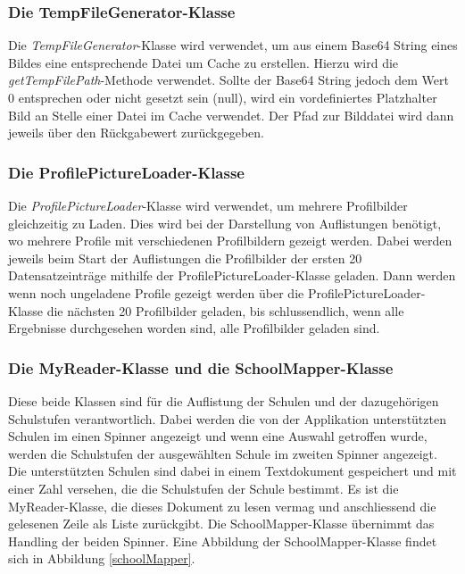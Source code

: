 \documentclass[../main.tex]{subfiles}
\begin{document}
	\subsubsection{Die TempFileGenerator-Klasse}
	Die \emph{TempFileGenerator}-Klasse wird verwendet, um aus einem Base64 String eines Bildes eine entsprechende Datei um Cache zu erstellen. Hierzu wird die \emph{getTempFilePath}-Methode verwendet. Sollte der Base64 String jedoch dem Wert 0 entsprechen oder nicht gesetzt sein (null), wird ein vordefiniertes Platzhalter Bild an Stelle einer Datei im Cache verwendet. Der Pfad zur Bilddatei wird dann jeweils über den Rückgabewert zurückgegeben.
	
	\subsubsection{Die ProfilePictureLoader-Klasse}
	Die \emph{ProfilePictureLoader}-Klasse wird verwendet, um mehrere Profilbilder gleichzeitig zu Laden. Dies wird bei der Darstellung von Auflistungen benötigt, wo mehrere Profile mit verschiedenen Profilbildern gezeigt werden. Dabei werden jeweils beim Start der Auflistungen die Profilbilder der ersten 20 Datensatzeinträge mithilfe der ProfilePictureLoader-Klasse geladen. Dann werden wenn noch ungeladene Profile gezeigt werden über die ProfilePictureLoader-Klasse die nächsten 20 Profilbilder geladen, bis schlussendlich, wenn alle Ergebnisse durchgesehen worden sind, alle Profilbilder geladen sind.
	
	\subsubsection{Die MyReader-Klasse und die SchoolMapper-Klasse}
	Diese beide Klassen sind für die Auflistung der Schulen und der dazugehörigen Schulstufen verantwortlich. Dabei werden die von der Applikation unterstützten Schulen im einen Spinner angezeigt und wenn eine Auswahl getroffen wurde, werden die Schulstufen der ausgewählten Schule im zweiten Spinner angezeigt. Die unterstützten Schulen sind dabei in einem Textdokument gespeichert und mit einer Zahl versehen, die die Schulstufen der Schule bestimmt. Es ist die MyReader-Klasse, die dieses Dokument zu lesen vermag und anschliessend die gelesenen Zeile als Liste zurückgibt. Die SchoolMapper-Klasse übernimmt das Handling der beiden Spinner. Eine Abbildung der SchoolMapper-Klasse findet sich in Abbildung \ref{schoolMapper}.
	
\end{document}
